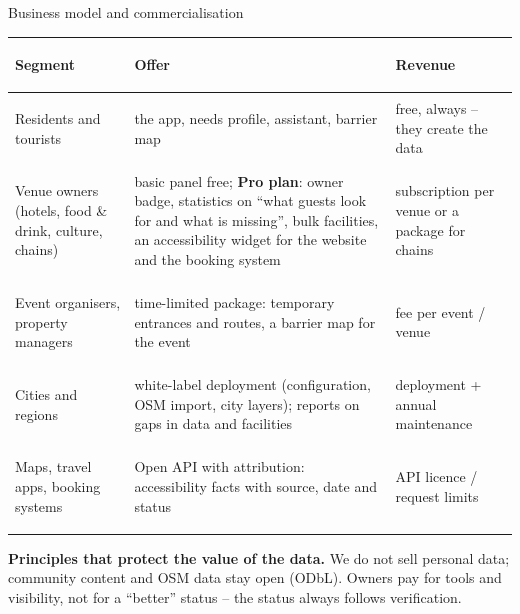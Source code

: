 \begin{frame}{Business model and commercialisation}
  \footnotesize
  \renewcommand{\arraystretch}{1.1}
  \begin{tabularx}{\textwidth}{@{}>{\bfseries\raggedright\arraybackslash}p{3.1cm} X >{\raggedright\arraybackslash}p{3.4cm}@{}}
    \toprule
    Segment & Offer & Revenue \\
    \midrule
    Residents and tourists & the app, needs profile, assistant, barrier map & free, always -- they create the data \\
    Venue owners (hotels, food \& drink, culture, chains) & basic panel free; \textbf{Pro plan}: owner badge,
      statistics on “what guests look for and what is missing”, bulk facilities, an accessibility widget
      for the website and the booking system & subscription per venue or a package for chains \\
    Event organisers, property managers & time-limited package: temporary entrances and routes,
      a barrier map for the event & fee per event / venue \\
    Cities and regions & white-label deployment (configuration, OSM import, city layers); reports on
      gaps in data and facilities & deployment + annual maintenance \\
    Maps, travel apps, booking systems & Open API with attribution: accessibility facts with source,
      date and status & API licence / request limits \\
    \bottomrule
  \end{tabularx}

  \vspace{1mm}
  \textbf{Principles that protect the value of the data.} We do not sell personal data; community content and OSM data
  stay open (ODbL). Owners pay for tools and visibility, not for a “better” status -- the status always follows verification.

\end{frame}
